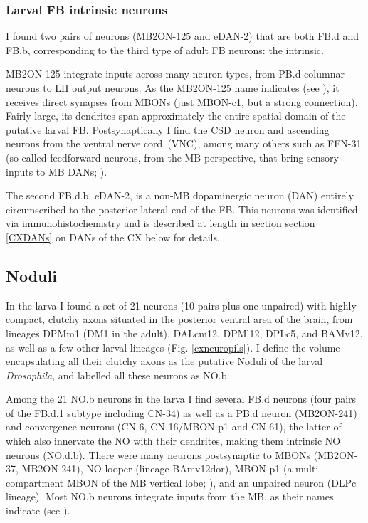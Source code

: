          \subsubsection{Larval FB intrinsic neurons}

    I found two pairs of neurons (MB2ON-125 and eDAN-2) that are both FB.d and FB.b, corresponding to the third type of adult FB neurons: the intrinsic.

    MB2ON-125 integrate inputs across many neuron types, from PB.d columnar neurons to LH output neurons.
    As the MB2ON-125 name indicates (see \citep{eschbach2021circuits}), it receives direct synapses from MBONs (just MBON-c1, but a strong connection).
    Fairly large, its dendrites span approximately the entire spatial domain of the putative larval FB.  Postsynaptically I find the CSD neuron \citep{berck2016wiring} and ascending neurons from the ventral nerve cord~(VNC), among many others such as FFN-31 (so-called feedforward neurons, from the MB perspective, that bring sensory inputs to MB DANs; \citep{eschbach2021circuits}).

    The second FB.d.b, eDAN-2, is a non-MB dopaminergic neuron (DAN) entirely circumscribed to the posterior-lateral end of the FB. This neurons was identified via immunohistochemistry and is described at length in section section \ref{CXDANs} on DANs of the CX below for details.
    
     \subsection{Noduli}
    \label{NO}

    In the larva I found a set of 21 neurons (10 pairs plus one unpaired) with highly compact, clutchy axons situated in the posterior ventral area of the brain, from lineages DPMm1 (DM1 in the adult), DALcm12, DPMl12, DPLc5, and BAMv12, as well as a few other larval lineages (Fig. \ref{cxneuropils}).
    I define the volume encapsulating all their clutchy axons as the putative Noduli of the larval \textit{Drosophila}, and labelled all these neurons as NO.b.

    Among the 21 NO.b neurons in the larva I find several FB.d neurons (four pairs of the FB.d.1 subtype including CN-34) as well as a PB.d neuron (MB2ON-241) and convergence neurons (CN-6, CN-16/MBON-p1 \citep{eschbach2020recurrent} and CN-61), the latter of which also innervate the NO with their dendrites, making them intrinsic NO neurons (NO.d.b). There were many neurons postsynaptic to MBONs (MB2ON-37, MB2ON-241), NO-looper (lineage BAmv12dor), MBON-p1 (a multi-compartment MBON of the MB vertical lobe; \citep{eichler2017complete}), and an unpaired neuron (DLPc lineage). Most NO.b neurons integrate inputs from the MB, as their names indicate (see \citep{eschbach2021circuits}).

